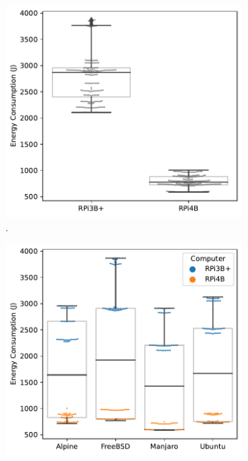 \begin{figure}[t]
\begin{subfigure}[t]{0.49\textwidth}
    \centering
    \includegraphics[width=\textwidth]{images/E_per_SUT.pdf}
    \caption{.}
    \label{fig:e_per_sut}
\end{subfigure}
\hspace{\fill}
\begin{subfigure}[t]{0.49\textwidth}
    \centering
    \includegraphics[width=\textwidth]{images/E_per_OS.pdf}

\end{subfigure}
\end{figure}
